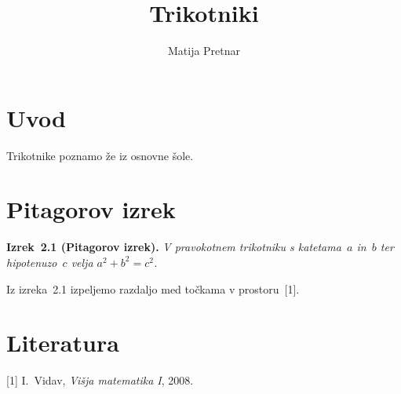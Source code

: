 \documentclass[11pt,a4paper]{article}
\title{Trikotniki}
\author{Matija Pretnar}
\date{}
\begin{document}
\maketitle

\section{Uvod}
Trikotnike poznamo že iz osnovne šole.

\section{Pitagorov izrek}
\textbf{Izrek~2.1 (Pitagorov izrek).}
\emph{V pravokotnem trikotniku s katetama~\(a\) in~\(b\) ter hipotenuzo~\(c\) velja
\(a^2 + b^2 = c^2\).}

Iz izreka~2.1 izpeljemo razdaljo med točkama v prostoru~[1].

\section*{Literatura}
[1] I.~Vidav, \emph{Višja matematika I}, 2008.
\end{document}
